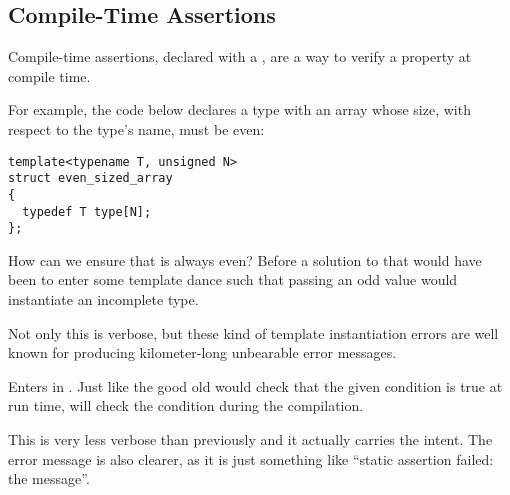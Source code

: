 \subsection{Compile-Time Assertions}

\problemtitle

Compile-time assertions, declared with a , are a
way to verify a property at compile time.

For example, the code below declares a type with an array whose size,
with respect to the type's name, must be even:

\begin{lstlisting}
template<typename T, unsigned N>
struct even_sized_array
{
  typedef T type[N];
};
\end{lstlisting}

How can we ensure that  is always even? Before  a
solution to that would have been to enter some template dance such
that passing an odd value would instantiate an incomplete type.



Not only this is verbose, but these kind of template instantiation
errors are well known for producing kilometer-long unbearable error
messages.

\solutiontitle

Enters  in . Just like the good old
 would check that the given condition is true
at run time,  will check the
condition during the compilation.



This is very less verbose than previously and it actually carries the
intent. The error message is also clearer, as it is just something
like ``static assertion failed: the message''.
